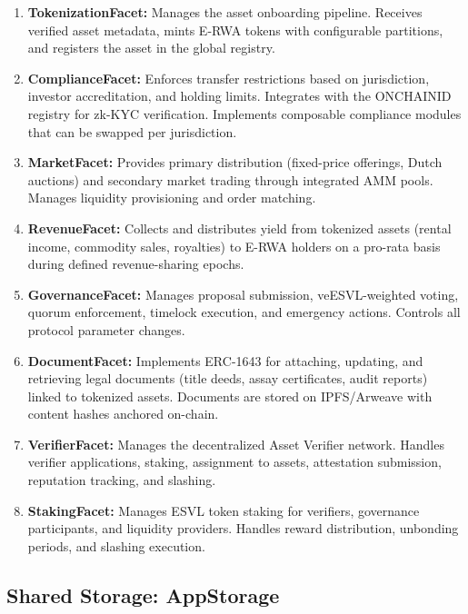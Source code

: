 \documentclass[11pt,a4paper]{article}
\begin{document}
\begin{enumerate}[nosep]
    \item \textbf{TokenizationFacet:} Manages the asset onboarding pipeline. Receives verified asset metadata, mints E-RWA tokens with configurable partitions, and registers the asset in the global registry.

    \item \textbf{ComplianceFacet:} Enforces transfer restrictions based on jurisdiction, investor accreditation, and holding limits. Integrates with the ONCHAINID registry for zk-KYC verification. Implements composable compliance modules that can be swapped per jurisdiction.

    \item \textbf{MarketFacet:} Provides primary distribution (fixed-price offerings, Dutch auctions) and secondary market trading through integrated AMM pools. Manages liquidity provisioning and order matching.

    \item \textbf{RevenueFacet:} Collects and distributes yield from tokenized assets (rental income, commodity sales, royalties) to E-RWA holders on a pro-rata basis during defined revenue-sharing epochs.

    \item \textbf{GovernanceFacet:} Manages proposal submission, veESVL-weighted voting, quorum enforcement, timelock execution, and emergency actions. Controls all protocol parameter changes.

    \item \textbf{DocumentFacet:} Implements ERC-1643 for attaching, updating, and retrieving legal documents (title deeds, assay certificates, audit reports) linked to tokenized assets. Documents are stored on IPFS/Arweave with content hashes anchored on-chain.

    \item \textbf{VerifierFacet:} Manages the decentralized Asset Verifier network. Handles verifier applications, staking, assignment to assets, attestation submission, reputation tracking, and slashing.

    \item \textbf{StakingFacet:} Manages ESVL token staking for verifiers, governance participants, and liquidity providers. Handles reward distribution, unbonding periods, and slashing execution.
\end{enumerate}

\subsection{Shared Storage: AppStorage}
\end{document}
